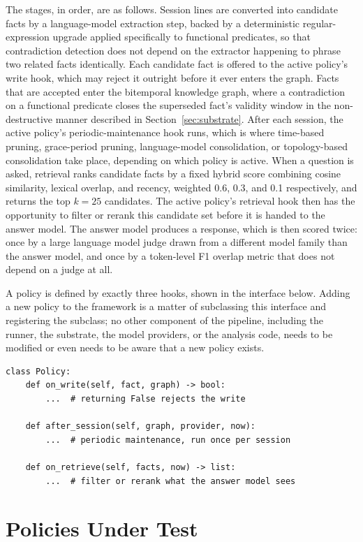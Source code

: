 The stages, in order, are as follows. Session lines are converted into candidate facts by a language-model extraction step, backed by a deterministic regular-expression upgrade applied specifically to functional predicates, so that contradiction detection does not depend on the extractor happening to phrase two related facts identically. Each candidate fact is offered to the active policy's write hook, which may reject it outright before it ever enters the graph. Facts that are accepted enter the bitemporal knowledge graph, where a contradiction on a functional predicate closes the superseded fact's validity window in the non-destructive manner described in Section~\ref{sec:substrate}. After each session, the active policy's periodic-maintenance hook runs, which is where time-based pruning, grace-period pruning, language-model consolidation, or topology-based consolidation take place, depending on which policy is active. When a question is asked, retrieval ranks candidate facts by a fixed hybrid score combining cosine similarity, lexical overlap, and recency, weighted 0.6, 0.3, and 0.1 respectively, and returns the top $k = 25$ candidates. The active policy's retrieval hook then has the opportunity to filter or rerank this candidate set before it is handed to the answer model. The answer model produces a response, which is then scored twice: once by a large language model judge drawn from a different model family than the answer model, and once by a token-level F1 overlap metric that does not depend on a judge at all.

A policy is defined by exactly three hooks, shown in the interface below. Adding a new policy to the framework is a matter of subclassing this interface and registering the subclass; no other component of the pipeline, including the runner, the substrate, the model providers, or the analysis code, needs to be modified or even needs to be aware that a new policy exists.

\begin{verbatim}
class Policy:
    def on_write(self, fact, graph) -> bool:
        ...  # returning False rejects the write

    def after_session(self, graph, provider, now):
        ...  # periodic maintenance, run once per session

    def on_retrieve(self, facts, now) -> list:
        ...  # filter or rerank what the answer model sees
\end{verbatim}

\section{Policies Under Test}
\label{sec:policies}


